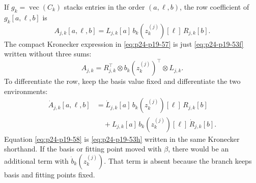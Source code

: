 \documentclass[11pt]{article}
\numberwithin{equation}{section}
\newcommand{\vecop}{\operatorname{vec}}
\begin{document}
If \(g_k=\vecop(C_k)\) stacks entries in the order \((a,\ell,b)\), the row
coefficient of \(g_k[a,\ell,b]\) is
\begin{equation}
    A_{j,k}[a,\ell,b]
    =
    L_{j,k}[a]\,
    b_k(z_k^{(j)})[\ell]\,
    R_{j,k}[b].
    \label{eq:p24-p19-53f}
\end{equation}
The compact Kronecker expression in \eqref{eq:p24-p19-57} is just \eqref{eq:p24-p19-53f} written without three
sums:
\begin{equation}
    A_{j,k}
    =
    R_{j,k}^{\top}\otimes b_k(z_k^{(j)})^\top\otimes L_{j,k}.
    \label{eq:p24-p19-53g}
\end{equation}
To differentiate the row, keep the basis value fixed and differentiate the
two environments:
\begin{equation}
\begin{aligned}
    \dot A_{j,k}[a,\ell,b]
    &=
    \dot L_{j,k}[a]\,
    b_k(z_k^{(j)})[\ell]\,
    R_{j,k}[b]\\
    &\quad+
    L_{j,k}[a]\,
    b_k(z_k^{(j)})[\ell]\,
    \dot R_{j,k}[b].
\end{aligned}
    \label{eq:p24-p19-53h}
\end{equation}
Equation \eqref{eq:p24-p19-58} is \eqref{eq:p24-p19-53h} written in the same Kronecker shorthand.  If the basis
or fitting point moved with \(\beta\), there would be an additional term with
\(\dot b_k(z_k^{(j)})\).  That term is absent because the branch keeps basis
and fitting points fixed.
\end{document}
